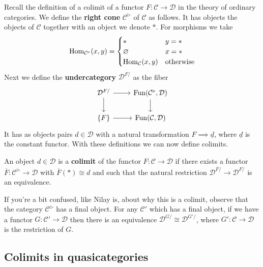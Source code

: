 \documentclass{amsart}
\DeclareMathOperator{\Fun}{Fun}
\begin{document}
Recall the definition of a colimit of a functor $F:\mathcal{C}\to \mathcal{D}$ in the theory of ordinary categories.
We define the \textbf{right cone} $\mathcal{C}^\triangleright$ of $\mathcal{C}$ as follows.
It has objects the objects of $\mathcal{C}$ together with an object we denote $*$. For morphisms
we take
\begin{equation*}
    \operatorname{Hom}_{\mathcal{C}^\triangleright}(x,y) = 
    \begin{cases}
        * & y=* \\
        \varnothing & x=* \\
        \operatorname{Hom}_\mathcal{C}(x,y) & \text{otherwise}
    \end{cases}
\end{equation*}
Next we define the \textbf{undercategory} $\mathcal{D}^{F/}$ as the fiber
\begin{equation*}
    \begin{tikzcd}
        \mathcal{D}^{F/} \dar\rar & \Fun(\mathcal{C}^\triangleright, \mathcal{D})\dar \\
        \{F\} \rar & \Fun(\mathcal{C},\mathcal{D})
    \end{tikzcd}
\end{equation*}
It has as objects pairs $d\in\mathcal{D}$ with a natural transformation
$F\implies \underline{d}$, where $\underline{d}$ is the constant functor.
With these definitions we can now define colimits.
\begin{definition}
    An object $d\in\mathcal{D}$ is a \textbf{colimit} of the functor $F:\mathcal{C}\to \mathcal{D}$
    if there exists a functor $\overline F:\mathcal{C}^\triangleright\to \mathcal{D}$ 
    with $\overline F(*)\cong d$ and such that the natural restriction
    $\mathcal{D}^{\overline F/} \to \mathcal{D}^{F/}$ is an equivalence.
\end{definition}

If you're a bit confused, like Nilay is, about why this is a colimit, observe that the category
$\mathcal{C}^\triangleright$ has a final object. 
For any $\mathcal{C}'$ which has a final object, if we have a functor
$G:\mathcal{C}'\to \mathcal{D}$ then there is an equivalence
$\mathcal{D}^{G/}\cong \mathcal{D}^{G'/}$, where $G':\mathcal{C}\to \mathcal{D}$
is the restriction of $G$.

\subsection{Colimits in quasicategories}
\end{document}
